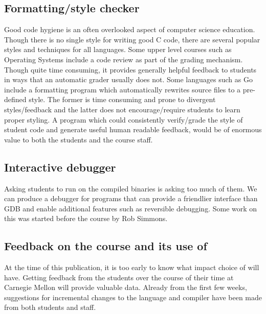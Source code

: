 \subsection{Formatting/style checker}

Good code hygiene is an often overlooked aspect of computer science education.
Though there is no single style for writing good C code, there are several
popular styles and techniques for all languages. Some upper level courses such
as Operating Systems include a code review as part of the grading mechanism.
Though quite time consuming, it provides generally helpful feedback to students
in ways that an automatic grader usually does not. Some languages such as Go
\cite{GoLang} include a formatting program which automatically
rewrites source files to a pre-defined style. The former is time consuming and
prone to divergent styles/feedback and the latter does not encourage/require
students to learn proper styling. A program which could consistently
verify/grade the style of student code and generate useful human readable
feedback, would be of enormous value to both the students and the course staff.

\subsection{Interactive debugger}

Asking students to run  on the compiled binaries is asking too
much of them. We can produce a debugger for \langname{} programs that can
provide a friendlier interface than GDB and enable additional features such as
reversible debugging. Some work on this was started before the course by Rob
Simmons.

\subsection{Feedback on the course and its use of \langnameb{}}

At the time of this publication, it is too early to know what impact choice of
\langname{} will have. Getting feedback from the students over the course of
their time at Carnegie Mellon will provide valuable data. Already from the first
few weeks, suggestions for incremental changes to the language and compiler have
been made from both students and staff.
